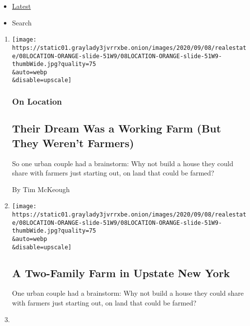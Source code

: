\begin{itemize}
\tightlist
\item
  \protect\hyperlink{stream-panel}{Latest}
\item
  Search
\end{itemize}

\begin{enumerate}
\def\labelenumi{\arabic{enumi}.}
\item
  \href{/2020/09/08/realestate/farming-hudson-valley.html}{}

  \texttt{[image: https://static01.graylady3jvrrxbe.onion/images/2020/09/08/realestate/08LOCATION-ORANGE-slide-51W9/08LOCATION-ORANGE-slide-51W9-thumbWide.jpg?quality=75\\\&auto=webp\\\&disable=upscale]}

  \hypertarget{on-location}{%
  \subsubsection{On Location}\label{on-location}}

  \hypertarget{their-dream-was-a-working-farm-but-they-werent-farmers}{%
  \subsection{Their Dream Was a Working Farm (But They Weren't
  Farmers)}\label{their-dream-was-a-working-farm-but-they-werent-farmers}}

  So one urban couple had a brainstorm: Why not build a house they could
  share with farmers just starting out, on land that could be farmed?

  By Tim McKeough
\item
  \href{/slideshow/2020/09/08/realestate/a-two-family-farm-in-upstate-new-york.html}{}

  \texttt{[image: https://static01.graylady3jvrrxbe.onion/images/2020/09/08/realestate/08LOCATION-ORANGE-slide-51W9/08LOCATION-ORANGE-slide-51W9-thumbWide.jpg?quality=75\\\&auto=webp\\\&disable=upscale]}

  \hypertarget{a-two-family-farm-in-upstate-new-york}{%
  \subsection{A Two-Family Farm in Upstate New
  York}\label{a-two-family-farm-in-upstate-new-york}}

  One urban couple had a brainstorm: Why not build a house they could
  share with farmers just starting out, on land that could be farmed?
\item
  \href{/2020/09/07/realestate/430000-homes-in-california.html}{}


\end{enumerate}
